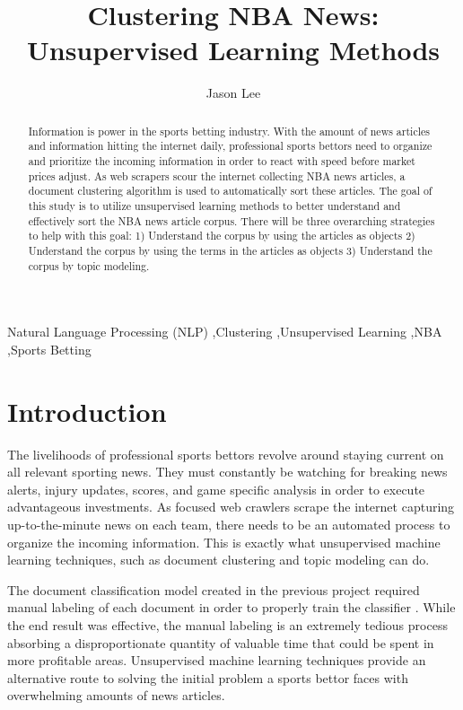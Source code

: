 \documentclass[5p,authoryear]{elsarticle}
\begin{document}
\begin{frontmatter}

\title{Clustering NBA News: \\Unsupervised Learning Methods}
\author{Jason Lee}
\address{Northwestern University, SPS \\Natural Language Processing \\2020SP MSDS 453-56}


\begin{abstract}
Information is power in the sports betting industry. 
With the amount of news articles and information hitting the internet daily, professional sports bettors need to organize and prioritize the incoming information in order to react with speed before market prices adjust.
As web scrapers scour the internet collecting NBA news articles, a document clustering algorithm is used to automatically sort these articles. 
The goal of this study is to utilize unsupervised learning methods to better understand and effectively sort the NBA news article corpus. There will be three overarching strategies to help with this goal: 1) Understand the corpus by using the articles as objects 2) Understand the corpus by using the terms in the articles as objects 3) Understand the corpus by topic modeling. 
\end{abstract}


\begin{keyword}
Natural Language Processing (NLP) \sep Clustering \sep Unsupervised Learning \sep NBA \sep Sports Betting 
\end{keyword}

\end{frontmatter}


\section{Introduction}\label{introduction}

The livelihoods of professional sports bettors revolve around staying current on all relevant sporting news. 
They must constantly be watching for breaking news alerts, injury updates, scores, and game specific analysis in order to execute advantageous investments.
As focused web crawlers scrape the internet capturing up-to-the-minute news on each team, there needs to be an automated process to organize the incoming information. 
This is exactly what unsupervised machine learning techniques, such as document clustering and topic modeling can do.

The document classification model created in the previous project required manual labeling of each document in order to properly train the classifier \citep{project2}. 
While the end result was effective, the manual labeling is an extremely tedious process absorbing a disproportionate quantity of valuable time that could be spent in more profitable areas. 
Unsupervised machine learning techniques provide an alternative route to solving the initial problem a sports bettor faces with overwhelming amounts of news articles.
\end{document}
